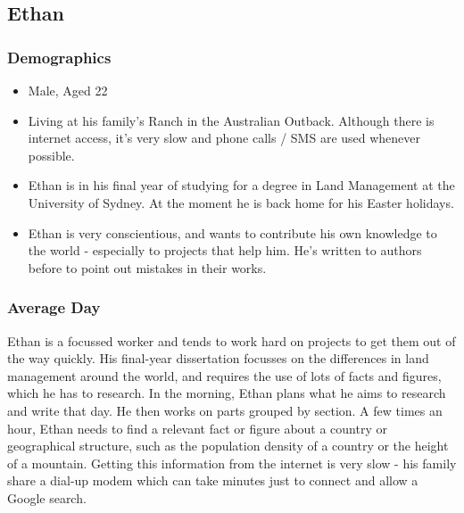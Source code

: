 \documentclass{article}
\begin{document}
\newpage
\subsection{Ethan}
\subsubsection{Demographics}
\begin{itemize}
  \item Male, Aged 22
  \item Living at his family's Ranch in the Australian Outback.  Although there is internet access, it's very slow and phone calls / SMS are used whenever possible.
  \item Ethan is in his final year of studying for a degree in Land Management at the University of Sydney.  At the moment he is back home for his Easter holidays.
    \item Ethan is very conscientious, and wants to contribute his own knowledge to the world - especially to projects that help him.  He's written to authors before to point out mistakes in their works.
\end{itemize}
\subsubsection{Average Day}
Ethan is a focussed worker and tends to work hard on projects to get them out of the way quickly.  His final-year dissertation focusses on the differences in land management around the world, and requires the use of lots of facts and figures, which he has to research.  In the morning, Ethan plans what he aims to research and write that day.  He then works on parts grouped by section.  A few times an hour, Ethan needs to find a relevant fact or figure about a country or geographical structure, such as the population density of a country or the height of a mountain.  Getting this information from the internet is very slow - his family share a dial-up modem which can take minutes just to connect and allow a Google search.
\end{document}
